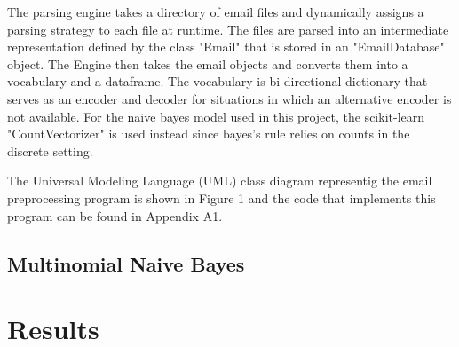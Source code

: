 \documentclass[10pt,a4paper]{article}
\begin{document}
The parsing engine takes a directory of email files and dynamically assigns a parsing strategy to each file at runtime. The files are parsed into an intermediate representation defined by the class "Email" that is stored in an "EmailDatabase" object. The Engine then takes the email objects and converts them into a vocabulary and a dataframe. The vocabulary is bi-directional dictionary that serves as an encoder and decoder for situations in which an alternative encoder is not available. For the naive bayes model used in this project, the scikit-learn "CountVectorizer" is used instead since bayes's rule relies on counts in the discrete setting.

The Universal Modeling Language (UML) class diagram representig the email preprocessing program is shown in Figure 1 and the code that implements this program can be found in Appendix A1.

\subsection{Multinomial Naive Bayes} 


\section{Results}
\end{document}
